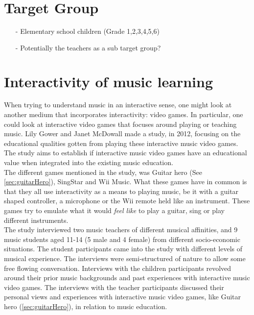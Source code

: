 \section{Target Group}

\begin{itemize}
	\item[-] Elementary school children (Grade 1,2,3,4,5,6)
	\item[-] Potentially the teachers as a sub target group?
\end{itemize}


\section{Interactivity of music learning}
	When trying to understand music in an interactive sense, one might look at another medium that incorporates interactivity: video games. In particular, one could look at interactive video games that focuses around playing or teaching music. Lily Gower and Janet McDowall made a study, in 2012, focusing on the educational qualities gotten from playing these interactive music video games\cite{interactiveMusicVideoGames}. The study aims to establish if interactive music video games have an educational value when integrated into the existing music education.\\
	
	The different games mentioned in the study, was Guitar hero (See \autoref{sec:guitarHero}), SingStar and Wii Music. What these games have in common is that they all use interactivity as a means to playing music, be it with a guitar shaped controller, a microphone or the Wii remote held like an instrument. These games try to emulate what it would \textit{feel like} to play a guitar, sing or play different instruments.\\
	
	The study interviewed two music teachers of different musical affinities, and 9 music students aged 11-14 (5 male and 4 female) from different socio-economic situations. The student participants came into the study with different levels of musical experience. The interviews were semi-structured of nature to allow some free flowing conversation. Interviews with the children participants revolved around their prior music backgrounds and past experiences with interactive music video games. The interviews with the teacher participants discussed their personal views and experiences with interactive music video games, like Guitar hero (\autoref{sec:guitarHero}), in relation to music education. \\
	
